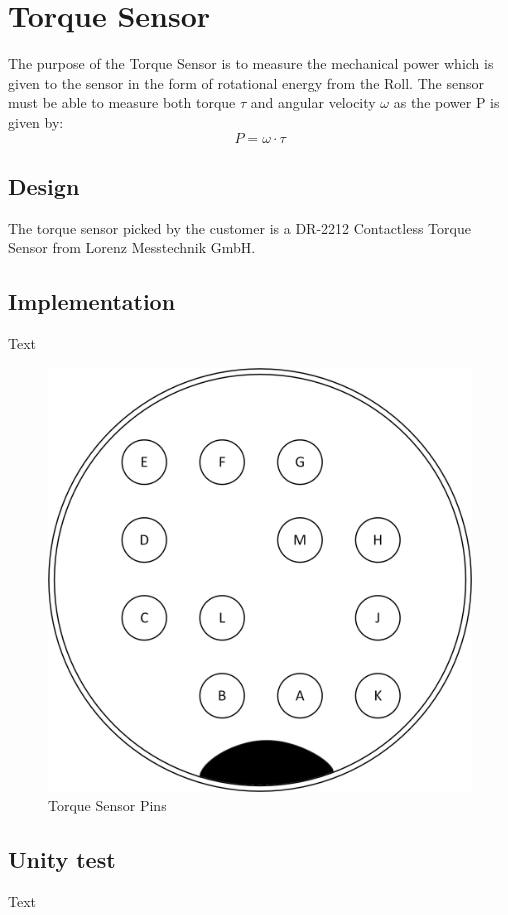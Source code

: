 \section{Torque Sensor}
The purpose of the Torque Sensor is to measure the mechanical power which is given to the sensor in the form of rotational energy from the Roll. The sensor must be able to measure both torque $\tau$ and angular velocity $\omega$ as the power P is given by:
\begin{equation}
	P=\omega\cdot\tau
\end{equation}

\subsection{Design}
The torque sensor picked by the customer is a DR-2212 Contactless Torque Sensor from Lorenz Messtechnik GmbH.

\subsection{Implementation}
Text

\begin{figure}[H]
	\centering
	\includegraphics[width=0.3\linewidth]{Hardware/Pictures/Torque_Sensor_Pins}
	\caption{Torque Sensor Pins}
	\label{fig:Torque_pins}
\end{figure}

\subsection{Unity test}
Text